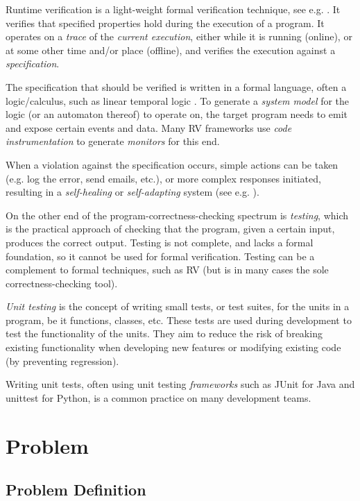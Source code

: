\documentclass[a4paper,11pt]{article}
\begin{document}
Runtime verification is a light-weight formal verification technique, see e.g. \cite{leucker08,delgado04}.
It verifies that specified properties hold during the execution of a program. It operates on a \emph{trace} of the \emph{current execution}, either while it is running (online), or at some other time and/or place (offline), and verifies the execution against a \emph{specification}.

The specification that should be verified is written in a formal
language, often a logic/calculus, such as linear temporal logic \cite{pnueli77}. To generate
a \emph{system model} for the logic (or an automaton thereof) to operate on, the target program
needs to emit and expose certain events and data. Many RV frameworks use \textit{code instrumentation}
to generate \textit{monitors} for this end.

When a violation against the specification occurs, simple actions can be taken (e.g. log the error, send emails, etc.), or more complex responses initiated, resulting in a \textit{self-healing} or \textit{self-adapting} system (see e.g. \cite{huebscher08}).

On the other end of the program-correctness-checking spectrum is \emph{testing}, which is the
practical approach of checking that the program, given a certain input, produces the correct output.
Testing is not complete, and lacks a formal foundation, so it cannot be used for formal verification. 
Testing can be a complement to formal techniques, such as RV (but is in many cases the sole correctness-checking tool).

\textit{Unit testing} is the concept of writing small tests, or test suites, for the units in
a program, be it functions, classes, etc. These tests are used during development to test the 
functionality of the units. They aim to reduce the risk of breaking existing functionality when 
developing new features or modifying existing code (by preventing regression).

Writing unit tests, often using unit testing \textit{frameworks} such as JUnit \cite{junit}
for Java and unittest \cite{python-unittest} for Python, is a common practice on many
development teams.


\section{Problem}

\subsection{Problem Definition}
\end{document}
